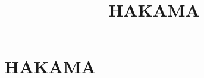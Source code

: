 \documentclass[a4j]{jreport}
\title{HAKAMA\\
}
\author{$B@81[>;8J(B}
\begin{document}
\maketitle

\chapter{HAKAMA}



\end{document}
